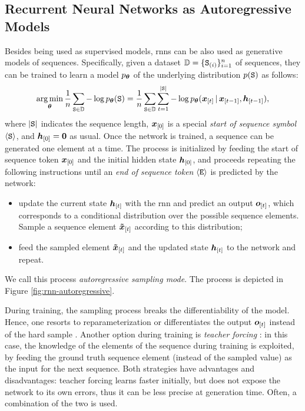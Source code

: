 \subsection{Recurrent Neural Networks as Autoregressive Models}
Besides being used as supervised models, \glspl{rnn} can be also used as generative models of sequences. Specifically, given a dataset $\Data = \{\PatternGraph{S}{i}\}_{i=1}^n$ of sequences, they can be trained to learn a model $p_{\boldsymbol{\theta}}$ of the underlying distribution $p(\GraphU{s})$ as follows:
$$\argmin_{\Param} \frac{1}{n} \sum_{\GraphU{s} \in \Data} - \log p_{\Param}(\GraphU{s}) = \frac{1}{n} \sum_{\GraphU{s} \in \Data} \sum_{t=1}^{|\GraphU{s}|} - \log p_{\Param}(\Elem{x}{t} \given \Elem{x}{t-1}, \Elem{h}{t-1}),$$
where $|\GraphU{S}|$ indicates the sequence length, $\Elem{x}{0}$ is a special \emph{start of sequence symbol} $\langle \mathtt{S} \rangle$, and $\Elem{h}{0} = \Zeros$ as usual. Once the network is trained, a sequence can be generated one element at a time. The process is initialized by feeding the start of sequence token $\Elem{x}{0}$ and the initial hidden state $\Elem{h}{0}$, and proceeds repeating the following instructions until an \emph{end of sequence token} $\langle \mathtt{E} \rangle$ is predicted by the network:
\begin{itemize}
    \item update the current state $\Elem{h}{t}$ with the \gls{rnn} and predict an output $\Elem{o}{t}$, which corresponds to a conditional distribution over the possible sequence elements. Sample a sequence element $\Elem{\tilde{x}}{t}$ according to this distribution;
    \item feed the sampled element $\Elem{\tilde{x}}{t}$ and the updated state $\Elem{h}{t}$ to the network and repeat.
\end{itemize}
We call this process \emph{autoregressive sampling mode}. The process is depicted in Figure \ref{fig:rnn-autoregressive}.
\begin{figure*}[h!]
    \centering
    \resizebox{.7\textwidth}{!}{}
    \caption{An example of training a recurrent neural network for learning an autoregressive distribution. The dashed arrows indicate non-differentiable operations.}
    \label{fig:rnn-autoregressive}
\end{figure*}
During training, the sampling process breaks the differentiability of the model. Hence, one resorts to reparameterization \citep{jang2017gumbel} or differentiates the output $\Elem{o}{t}$ instead of the hard sample \citep{bengio2013straighttrough}. Another option during training is \emph{teacher forcing} \citep{williams1989teacherforcing}: in this case, the knowledge of the elements of the sequence during training is exploited, by feeding the ground truth sequence element (instead of the sampled value) as the input for the next sequence. Both strategies have advantages and disadvantages: teacher forcing learns faster initially, but does not expose the network to its own errors, thus it can be less precise at generation time. Often, a combination of the two is used.
